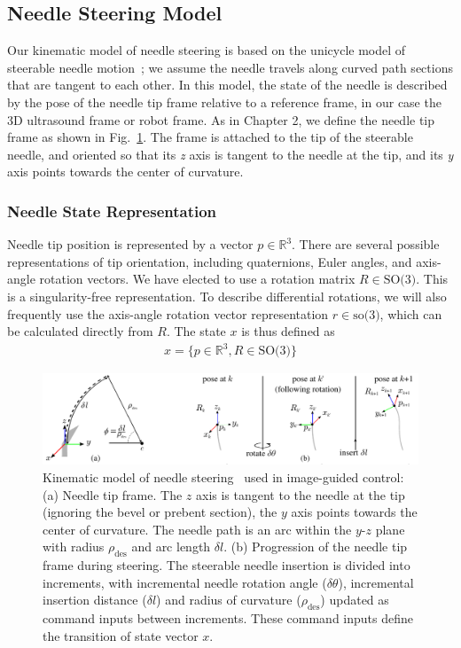 \subsection{Needle Steering Model}
Our kinematic model of needle steering is based on the unicycle model of steerable needle motion~\cite{Webster2006,Park2005}; we assume the needle travels along curved path sections that are tangent to each other. In this model, the state of the needle is described by the pose of the needle tip frame relative to a reference frame, in our case the 3D ultrasound frame or robot frame. As in Chapter 2, we define the needle tip frame as shown in Fig.~\ref{fig:NeedleKinematics}. The frame is attached to the tip of the steerable needle, and oriented so that its \textit{z} axis is tangent to the needle at the tip, and its \textit{y} axis points towards the center of curvature. 

\subsubsection{Needle State Representation}
Needle tip position is represented by a vector ${p} \in \mathbb{R}^3$. There are several possible representations of tip orientation, including quaternions, Euler angles, and axis-angle rotation vectors. We have elected to use a rotation matrix ${R} \in \textrm{SO(3)}$. This is a singularity-free representation. To describe differential rotations, we will also frequently use the axis-angle rotation vector representation $r \in \textrm{so(3)}$, which can be calculated directly from ${R}$. The state ${x}$ is thus defined as
\begin{align}
{x} = \{p \in \mathbb{R}^3, R \in \textrm{SO(3)}\}
\end{align}

\begin{figure}[!t]
\centering
\includegraphics[width=\textwidth]{Images/Chapter4/NeedleKinematics/NeedleKinematics}%
\caption[Kinematic model of needle steering]{Kinematic model of needle steering~\cite{Webster2006} used in image-guided control: (a) Needle tip frame. The $z$ axis is tangent to the needle at the tip (ignoring the bevel or prebent section), the $y$ axis points towards the center of curvature. The needle path is an arc within the $y$-$z$ plane with radius $\rho_\text{des}$ and arc length $\delta l$. (b) Progression of the needle tip frame during steering. The steerable needle insertion is divided into increments, with incremental needle rotation angle ($\delta\theta$), incremental insertion distance ($\delta l$) and radius of curvature ($\rho_\text{des}$) updated as command inputs between increments. These command inputs define the transition of state vector ${x}$.}
\label{fig:NeedleKinematics}
\end{figure}


